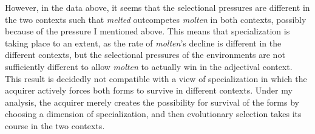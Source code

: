 \documentclass{artikel3}
\begin{document}
However, in the data above, it seems that the selectional pressures are different in the two contexts such that \textsl{melted} outcompetes \textsl{molten} in both contexts, possibly because of the pressure I mentioned above. This means that specialization is taking place to an extent, as the rate of \textsl{molten}'s decline is different in the different contexts, but the selectional pressures of the environments are not sufficiently different to allow \textsl{molten} to actually win in the adjectival context. This result is decidedly not compatible with a view of specialization in which the acquirer actively forces both forms to survive in different contexts. Under my analysis, the acquirer merely creates the possibility for survival of the forms by choosing a dimension of specialization, and then evolutionary selection takes its course in the two contexts.








\end{document}
